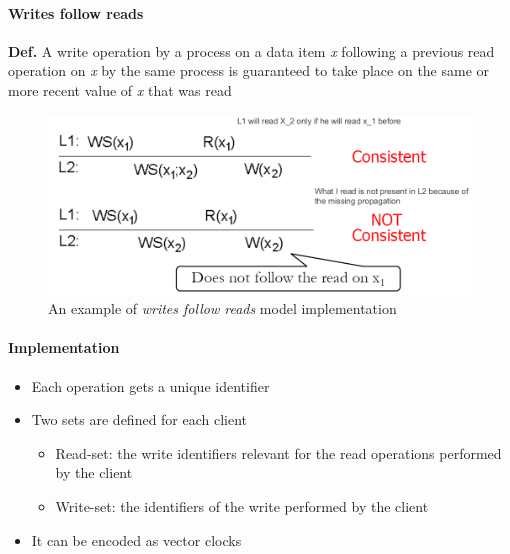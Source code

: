 \paragraph{Writes follow reads}\label{writes-follow-reads}

\textbf{Def.} A write operation by a process on a data item \emph{x}
following a previous read operation on \emph{x} by the same process is
guaranteed to take place on the same or more recent value of \emph{x}
that was read

\begin{figure}[htbp]
    \centering
    \includegraphics[width=\textwidth]{src/images/consistency-replication/writes-follow-reads.png}
    \caption{An example of \textit{writes follow reads} model implementation}
\end{figure}

\paragraph{Implementation}

\begin{itemize}
    \itemsep1pt\parskip0pt
    \item
      Each operation gets a unique identifier
      
    \item
      Two sets are defined for each client
    \begin{itemize}
        \item
          Read-set: the write identifiers relevant for the read operations
          performed by the client
        \item
          Write-set: the identifiers of the write performed by the client
    \end{itemize}
    
    \item
      It can be encoded as vector clocks
\end{itemize}


